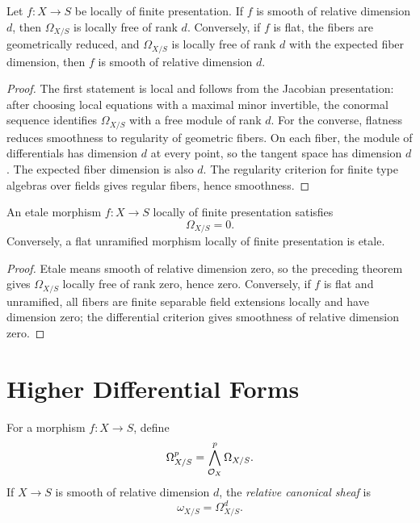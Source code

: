 \begin{theorem}
Let \(f:X\to S\) be locally of finite presentation.  If \(f\) is smooth of
relative dimension \(d\), then \(\Omega_{X/S}\) is locally free of rank \(d\).
Conversely, if \(f\) is flat, the fibers are geometrically reduced, and
\(\Omega_{X/S}\) is locally free of rank \(d\) with the expected fiber
dimension, then \(f\) is smooth of relative dimension \(d\).
\end{theorem}

\begin{proof}
The first statement is local and follows from the Jacobian presentation: after
choosing local equations with a maximal minor invertible, the conormal sequence
identifies \(\Omega_{X/S}\) with a free module of rank \(d\).  For the
converse, flatness reduces smoothness to regularity of geometric fibers.  On
each fiber, the module of differentials has dimension \(d\) at every point, so
the tangent space has dimension \(d\).  The expected fiber dimension is also
\(d\).  The regularity criterion for finite type algebras over fields gives
regular fibers, hence smoothness.
\end{proof}

\begin{corollary}
An etale morphism \(f:X\to S\) locally of finite presentation satisfies
\[
    \Omega_{X/S}=0.
\]
Conversely, a flat unramified morphism locally of finite presentation is etale.
\end{corollary}

\begin{proof}
Etale means smooth of relative dimension zero, so the preceding theorem gives
\(\Omega_{X/S}\) locally free of rank zero, hence zero.  Conversely, if \(f\) is
flat and unramified, all fibers are finite separable field extensions locally
and have dimension zero; the differential criterion gives smoothness of
relative dimension zero.
\end{proof}

\section{Higher Differential Forms}

\begin{definition}
For a morphism \(f:X\to S\), define
\[
    \Omega^p_{X/S}=\bigwedge^p_{\mathcal{O}_X}\Omega_{X/S}.
\]
If \(X\to S\) is smooth of relative dimension \(d\), the \emph{relative
canonical sheaf} is
\[
    \omega_{X/S}=\Omega^d_{X/S}.
\]
\end{definition}

